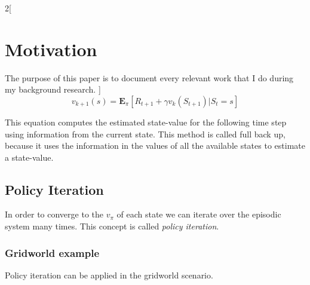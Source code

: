 \documentclass[a4paper]{article}
\begin{document}
\begin{multicols}{2}[
		\section*{Motivation}
		The purpose of this paper is to document every relevant work that I do during my background research.
		]
		\begin{equation}
			v_{k+1}(s) = \mathbf{E}_\pi[R_{t+1} + \gamma v_k(S_{t+1}) | S_t = s]
		\end{equation}
		
		This equation computes the estimated state-value for the following time step using information from the current state. This method is called full back up, because it uses the information in the values of all the available states to estimate a state-value.
		
		\subsection{Policy Iteration}
		In order to converge to the $v_\pi$ of each state we can iterate over the episodic system many times. This concept is called \textit{policy iteration}.
		
		\subsubsection{Gridworld example}
		Policy iteration can be applied in the gridworld scenario.
		
		
		
		
		\end{multicols}
		\pagebreak
	
%			
%			
\end{document}
